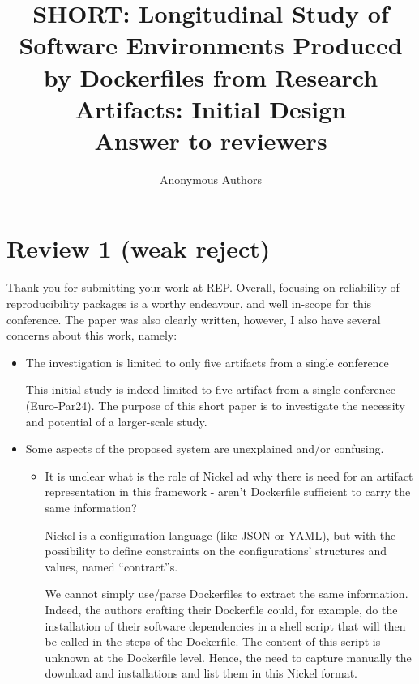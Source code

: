 \documentclass[%
	11pt,
	final,
]{article}
\title{%
       SHORT: Longitudinal Study of Software Environments Produced by Dockerfiles from Research Artifacts: Initial Design
	\\
	{\Large%
	Answer to reviewers
	}
}
\author{Anonymous Authors}
\date{}
\begin{document}
\maketitle

\section{Review 1 (weak reject)}

Thank you for submitting your work at REP. Overall, focusing on reliability of reproducibility packages is a worthy endeavour, and well in-scope for this conference. The paper was also clearly written, however, I also have several concerns about this work, namely:


\begin{itemize}
\item The investigation is limited to only five artifacts from a single conference

\begin{review-answer}
  This initial study is indeed limited to five artifact from a single conference (Euro-Par24).
  The purpose of this short paper is to investigate the necessity and potential of a larger-scale study.
\end{review-answer}

\item Some aspects of the proposed system are unexplained and/or confusing.
  \begin{itemize}
   \item It is unclear what is the role of Nickel ad why there is need for an artifact representation in this framework - aren't Dockerfile sufficient to carry the same information?
\begin{review-answer}
  Nickel is a configuration language (like JSON or YAML), but with the possibility to define constraints on the configurations' structures and values, named ``contract''s.

  We cannot simply use/parse Dockerfiles to extract the same information.
  Indeed, the authors crafting their Dockerfile could, for example, do the installation of their software dependencies in a shell script that will then be called in the steps of the Dockerfile.
  The content of this script is unknown at the Dockerfile level.
  Hence, the need to capture manually the download and installations and list them in this Nickel format.
  

\end{review-answer}
\end{itemize}
\end{itemize}
\end{document}
